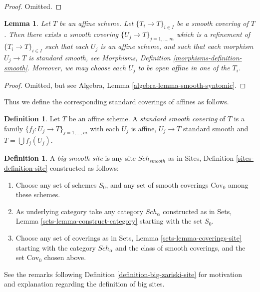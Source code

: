 \documentclass{stacks-project}
\theoremstyle{plain}
\newtheorem{lemma}[subsection]{Lemma}
\theoremstyle{definition}
\newtheorem{definition}[subsection]{Definition}
\theoremstyle{remark}
\numberwithin{equation}{subsection}
\def\Sch{\mathit{Sch}}
\begin{document}
\begin{proof}
Omitted.
\end{proof}

\begin{lemma}
\label{lemma-smooth-affine}
Let $T$ be an affine scheme.
Let $\{T_i \to T\}_{i \in I}$ be a smooth covering of $T$.
Then there exists a smooth covering
$\{U_j \to T\}_{j = 1, \ldots, m}$ which is a refinement
of $\{T_i \to T\}_{i \in I}$ such that each $U_j$ is an affine
scheme, and such that each morphism $U_j \to T$ is standard
smooth, see Morphisms, Definition \ref{morphisms-definition-smooth}.
Moreover, we may choose each $U_j$ to be open affine in one of the $T_i$.
\end{lemma}

\begin{proof}
Omitted, but see Algebra, Lemma \ref{algebra-lemma-smooth-syntomic}.
\end{proof}

\noindent
Thus we define the corresponding standard coverings of affines as follows.

\begin{definition}
\label{definition-standard-smooth}
Let $T$ be an affine scheme. A {\it standard smooth covering}
of $T$ is a family $\{f_j : U_j \to T\}_{j = 1, \ldots, m}$
with each $U_j$ is affine, $U_j \to T$ standard smooth
and $T = \bigcup f_j(U_j)$.
\end{definition}

\begin{definition}
\label{definition-big-smooth-site}
A {\it big smooth site} is any site $\Sch_{smooth}$ as in
Sites, Definition \ref{sites-definition-site} constructed as follows:
\begin{enumerate}
\item Choose any set of schemes $S_0$, and any set of smooth coverings
$\text{Cov}_0$ among these schemes.
\item As underlying category take any category $\Sch_\alpha$
constructed as in Sets, Lemma \ref{sets-lemma-construct-category}
starting with the set $S_0$.
\item Choose any set of coverings as in
Sets, Lemma \ref{sets-lemma-coverings-site} starting with the
category $\Sch_\alpha$ and the class of smooth coverings,
and the set $\text{Cov}_0$ chosen above.
\end{enumerate}
\end{definition}

\noindent
See the remarks following Definition \ref{definition-big-zariski-site}
for motivation and explanation regarding the definition of big sites.
\end{document}

